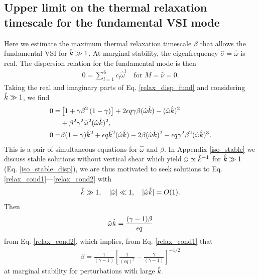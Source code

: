 
\subsection{Upper limit on the thermal relaxation timescale for the
  fundamental VSI mode}\label{iso_vsi_beta_crit}

Here we estimate the maximum thermal relaxation timescale
$\beta$ that allows the fundamental VSI for $\hat{k}\gg1$.   
At marginal stability, the eigenfrequency $\hat{\sigma}=\hat{\omega}$
is real. The dispersion relation for the fundamental mode is then
\begin{align}\label{relax_disp_fund}
  0 = \sum_{l=1}^{6}c_l\hat{\omega}^l \quad \text{for $M=\hat{\nu}=0$}.  
\end{align} 
Taking the real and imaginary parts of Eq. \ref{relax_disp_fund} and considering 
$\hat{k}\gg1$, we find
\begin{align}
  0 =& \left[1 + \gamma\beta^2\left(1-\gamma\right)\right] + 2\epsilon q
  \gamma\beta (\hat{\omega}\hat{k}) -  (\hat{\omega}\hat{k})^2 \notag\\
  &+ \beta^2\gamma^2\hat{\omega}^2 (\hat{\omega}\hat{k})^2,\label{relax_cond1}\\
  0=& \beta(1-\gamma)\hat{k}^2 + \epsilon q \hat{k}^2 (\hat{\omega}\hat{k})
  - 2\beta (\hat{\omega}\hat{k})^2 - \epsilon q \gamma^2\beta^2 (\hat{\omega}\hat{k})^3.\label{relax_cond2}
\end{align}
This is a pair of simultaneous equations for
$\hat{\omega}$ and $\beta$. In Appendix \ref {iso_stable} we discuss
stable solutions without vertical shear which yield
$\hat{\omega}\propto \hat{k}^{-1}$ for $\hat{k}\gg 1$
(Eq. \ref{iso_stable_disp}),  we are thus motivated to seek solutions
to Eq. \ref{relax_cond1}---\ref{relax_cond2} with  
\begin{align}
  \hat{k} \gg1, \quad |\hat{\omega}|\ll 1 ,\quad
  |\hat{\omega}\hat{k}|=O(1). 
\end{align}
Then
\begin{align}
  \hat{\omega}\hat{k} = \frac{(\gamma-1)\beta}{\epsilon q}
\end{align}
from Eq. \ref{relax_cond2}, which implies, from Eq. \ref{relax_cond1}
that
\begin{align}\label{beta_crit0}
  \beta = \frac{1}{(\gamma-1)}\left[\frac{1}{\left(\epsilon
        q\right)^2} - \frac{\gamma}{(\gamma-1)}\right]^{-1/2} 
\end{align}
at marginal stability for perturbations with large $\hat{k}$. 

